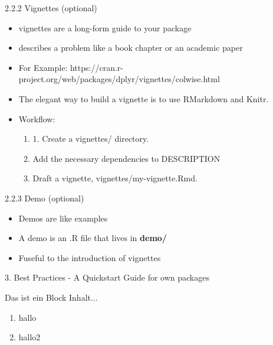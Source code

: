 \documentclass[11pt,a4paper]{beamer}
\begin{document}
\begin{frame}[t]{2.2.2 Vignettes (optional)}
	
	\begin{itemize}
		\item  vignettes are a long-form guide to your package
		\item  describes a problem like a book	chapter	or	an	academic paper
		\item For Example: https://cran.r-project.org/web/packages/dplyr/vignettes/colwise.html
		\item The elegant way to build a vignette is to use RMarkdown and Knitr.  
		\item Workflow: 
				
		\begin{enumerate}
			\item 1.	Create	a	vignettes/	directory.
			\item Add	the	necessary	dependencies	to	DESCRIPTION
			\item Draft	a	vignette,	vignettes/my-vignette.Rmd.
		\end{enumerate}
		
	\end{itemize}
	
\end{frame}




\begin{frame}[t]{2.2.3 Demo (optional)}
	
	\begin{itemize}
		\item Demos	are	like	examples
		\item A	demo is	an .R file that	lives in \textbf{demo/}
		\item Fuseful to the introduction of vignettes
	
		
	\end{itemize}
	
\end{frame}








\begin{frame}[t]{3. Best Practices - A Quickstart Guide for own packages }
	
	\begin{block}{Das ist ein Block}
		Inhalt...
	\end{block}
	
	\begin{enumerate}
		\item hallo
		\item hallo2
	\end{enumerate}

\end{frame}
\end{document}

